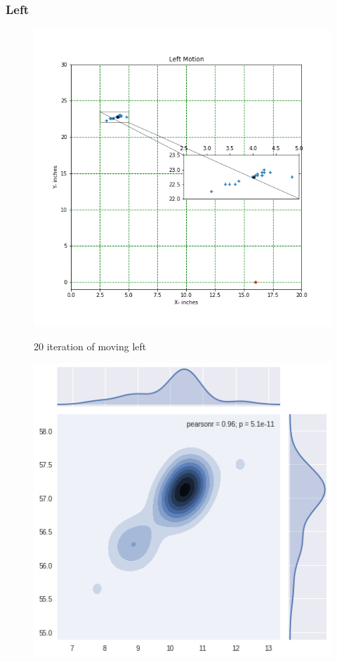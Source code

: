 \documentclass[11pt,a4paper,titlepage]{article}
\begin{document}
\begin{itemize}
\subsubsection{Left}
\begin{figure}[H]
	\centering	
		\includegraphics[width=1.2\linewidth]{left}
		\label{fig:sub1}
	\caption{20 iteration of moving left}
  \end{figure}
    \begin{figure}[H]
	\centering	
		\includegraphics[width=1.0\linewidth]{leftG}

\end{figure}
\end{itemize}
\end{document}
